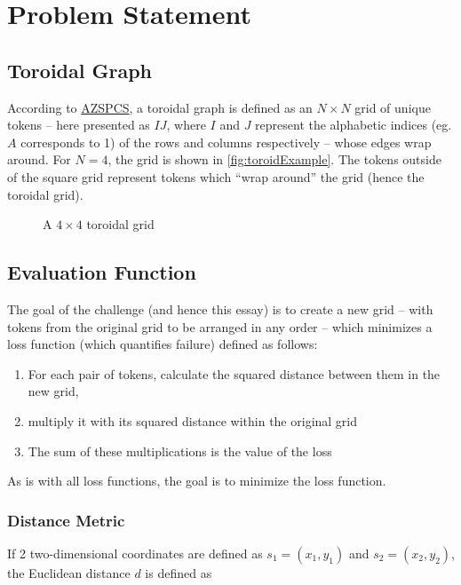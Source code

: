 \section{Problem Statement}%
\label{sec:problem_statement}

\subsection{Toroidal Graph}%
\label{sub:toroidal_graph}


According to \href{http://azspcs.com/Contest/Nearness}{AZSPCS}, a toroidal graph is defined as an $N\times N$ grid of unique tokens -- here presented as $IJ$, where $I$ and $J$ represent the alphabetic indices (eg. $A$ corresponds to 1) of the rows and columns respectively -- whose edges wrap around. For $N=4$, the grid is shown in \autoref{fig:toroidExample}. The tokens outside of the square grid represent tokens which ``wrap around'' the grid (hence the toroidal grid).
\begin{figure}[htpb]
    \centering
    \caption{A $4\times 4$ toroidal grid}%
    \label{fig:toroidExample}
\end{figure}

\subsection{Evaluation Function}%
\label{sub:evaluation_function}

The goal of the challenge (and hence this essay) is to create a new grid -- with tokens from the original grid to be arranged in any order -- which minimizes a loss function (which quantifies failure) defined as follows:
\begin{enumerate}
    \item For each pair of tokens, calculate the squared distance between them in the new grid,
\item multiply it with its squared distance within the original grid
\item The sum of these multiplications is the value of the loss
\end{enumerate}
As is with all loss functions, the goal is to minimize the loss function.

\subsubsection{Distance Metric}%
\label{ssub:distance_metric}
If 2 two-dimensional coordinates are defined as $s_1=(x_1,y_1)$ and $s_2=(x_2,y_2)$, the Euclidean distance $d$ is defined as

